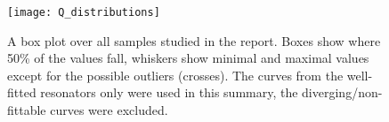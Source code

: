 \documentclass[12pt]{article}
\numberwithin{equation}{section}
\numberwithin{figure}{section}
\begin{document}
\begin{figure}[h!]
\centering
\texttt{[image: Q\_distributions]}
\caption{A box plot over all samples studied in the report. Boxes show where 50\% of the values fall, whiskers show minimal and maximal values except for the possible outliers (crosses). The curves from the well-fitted resonators only were used in this summary, the diverging/non-fittable curves were excluded.}
\end{figure}



\begin{comment}

Two resonator samples were studied, fabricated from Al and Nb films. Using the  \textit{circlefit} method the quality factors and frequencies were extracted at various probe powers ranging from single photon occupation regime to high powers.

The Nb sample has shown errors less than 1\% in frequency and more or less consistent quality factors; however, for the devices IV and VI $Q_e$ are significantly lower than for the rest. The internal quality factors have demonstrated an expected behaviour when the probe power was changed, ranging from $1.5\cdot10^4$ at single-photon level to maximum of $1.2 \cdot 10^5$ at high powers. The single-photon Q-factors are all similar heralding the uniform distribution of defects on the chip.

The Al sample has shown less than 2\% errors in frequency; however, if the correction for the wrong $\varepsilon_{Si}$ used in the calculation is applied, the errors would rise up to 3\%. The external quality factors are in deviation from the rest of the resonators for the devices III and VI. The internal quality factors are more uniform in values compared to the Nb sample, significantly lower at high powers and significantly higher at single-photon level. All values are in the range between $3\cdot10^4$ and $6 \cdot 10^4$.

In conclusion, it should be stated that Al technology is more suitable for the cQED experiments due to the apparently lower concentration of defects inside the surface oxide. However, the technological issues with fabricating aluminium chips at MIPT still are to be overcome. High hopes are anchored on NbN films which are known to have a large superconducting gap, and thus a suppressed quasiparticle concentration and no natural oxide layer in contrast to Nb or Al.
\end{comment}


\newpage



\end{document}

